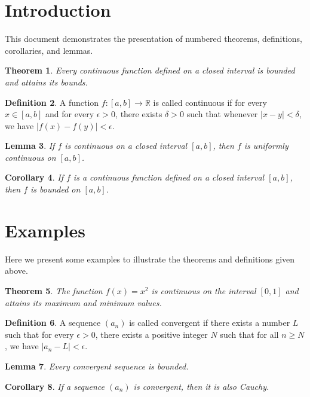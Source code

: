 \documentclass{article}
\theoremstyle{plain} %
\newtheorem{theorem}{Theorem}[section]
\newtheorem{lemma}[theorem]{Lemma}
\newtheorem{corollary}[theorem]{Corollary}
\theoremstyle{definition} %
\newtheorem{definition}[theorem]{Definition}
\begin{document}
	
	\section{Introduction}
	This document demonstrates the presentation of numbered theorems, definitions, corollaries, and lemmas.
	
	\begin{theorem}
		Every continuous function defined on a closed interval is bounded and attains its bounds.
	\end{theorem}
	
	\begin{definition}
		A function \( f: [a, b] \to \mathbb{R} \) is called continuous if for every \( x \in [a, b] \) and for every \( \epsilon > 0 \), there exists \( \delta > 0 \) such that whenever \( |x - y| < \delta \), we have \( |f(x) - f(y)| < \epsilon \).
	\end{definition}
	
	\begin{lemma}
		If \( f \) is continuous on a closed interval \( [a, b] \), then \( f \) is uniformly continuous on \( [a, b] \).
	\end{lemma}
	
	\begin{corollary}
		If \( f \) is a continuous function defined on a closed interval \( [a, b] \), then \( f \) is bounded on \( [a, b] \).
	\end{corollary}
	
	
	\section{Examples}
		Here we present some examples to illustrate the theorems and definitions given above.
	
	\begin{theorem}
		The function \( f(x) = x^2 \) is continuous on the interval \([0, 1]\) and attains its maximum and minimum values.
	\end{theorem}
	
	\begin{definition}
		A sequence \( (a_n) \) is called convergent if there exists a number \( L \) such that for every \( \epsilon > 0 \), there exists a positive integer \( N \) such that for all \( n \geq N \), we have \( |a_n - L| < \epsilon \).
	\end{definition}
	
	\begin{lemma}
		Every convergent sequence is bounded.
	\end{lemma}
	
	\begin{corollary}
		If a sequence \( (a_n) \) is convergent, then it is also Cauchy.
	\end{corollary}
	
\end{document}
